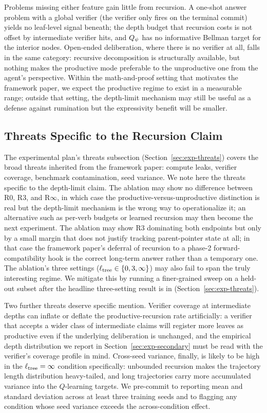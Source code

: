 Problems missing either feature gain little from recursion. A
one-shot answer problem with a global verifier (the verifier only fires
on the terminal commit) yields no leaf-level signal beneath; the depth
budget that recursion costs is not offset by intermediate verifier hits,
and $Q_{\psi}$ has no informative Bellman target for the interior nodes.
Open-ended deliberation, where there is no verifier at all, falls in the
same category: recursive decomposition is structurally available, but
nothing makes the productive mode preferable to the unproductive one
from the agent's perspective. Within the math-and-proof setting that
motivates the framework paper, we expect the productive regime to exist
in a measurable range; outside that setting, the depth-limit mechanism
may still be useful as a defense against rumination but the
expressivity benefit will be smaller.

\subsection{Threats Specific to the Recursion Claim}
\label{sec:disc-threats}

The experimental plan's threats subsection (Section~\ref{sec:exp-threats})
covers the broad threats inherited from the framework paper: compute
leaks, verifier coverage, benchmark contamination, seed variance. We
note here the threats specific to the depth-limit claim. The ablation
may show no difference between R0, R3, and R$\infty$, in which case the
productive-versus-unproductive distinction is real but the depth-limit
mechanism is the wrong way to operationalize it; an alternative such as
per-verb budgets or learned recursion may then become the next experiment.
The ablation may show R3 dominating both endpoints but only by a small
margin that does not justify tracking parent-pointer state at all; in
that case the framework paper's deferral of recursion to a phase-2
forward-compatibility hook is the correct long-term answer rather than
a temporary one. The ablation's three settings ($\ell_{\mathrm{tree}} \in \{0, 3,
\infty\}$) may also fail to span the truly interesting regime. We
mitigate this by running a finer-grained sweep on a held-out subset
after the headline three-setting result is in
(Section~\ref{sec:exp-threats}).

Two further threats deserve specific mention. Verifier coverage at
intermediate depths can inflate or deflate the productive-recursion rate
artificially: a verifier that accepts a wider class of intermediate
claims will register more leaves as productive even if the underlying
deliberation is unchanged, and the empirical depth distribution we
report in Section~\ref{sec:exp-secondary} must be read with the
verifier's coverage profile in mind. Cross-seed variance, finally, is
likely to be high in the $\ell_{\mathrm{tree}} = \infty$ condition specifically:
unbounded recursion makes the trajectory length distribution
heavy-tailed, and long trajectories carry more accumulated variance into
the $Q$-learning targets. We pre-commit to reporting mean and standard
deviation across at least three training seeds and to flagging any
condition whose seed variance exceeds the across-condition effect.

